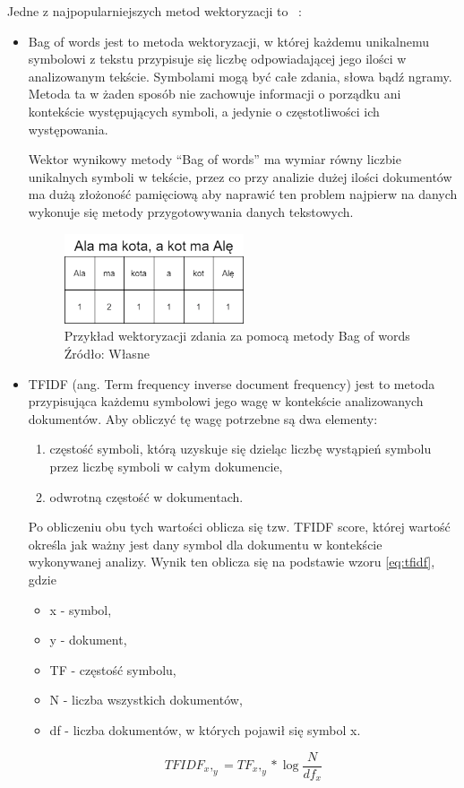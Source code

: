 Jedne z najpopularniejszych metod wektoryzacji to ~\cite{ML}: 
\begin{itemize}
    \item Bag of words jest to metoda wektoryzacji, w której każdemu unikalnemu symbolowi z tekstu przypisuje się liczbę 
    odpowiadającej jego ilości w analizowanym tekście. Symbolami mogą być całe zdania, słowa bądź ngramy. 
    Metoda ta w żaden sposób nie zachowuje informacji o porządku ani kontekście występujących symboli, a jedynie o 
    częstotliwości ich występowania. 
    
    Wektor wynikowy metody ``Bag of words'' ma wymiar równy liczbie unikalnych symboli w tekście, przez co przy analizie dużej ilości 
    dokumentów ma dużą złożoność pamięciową aby naprawić ten problem najpierw na danych wykonuje się metody przygotowywania danych tekstowych.

    \begin{figure}[h]
        \centering
        \includegraphics[width=0.5\textwidth]{./Img/bowexample.png}
        \caption{Przykład wektoryzacji zdania za pomocą metody Bag of words Źródło: Własne}
    \end{figure}

    \item TFIDF (ang. Term frequency inverse document frequency) jest to metoda przypisująca każdemu symbolowi 
    jego wagę w kontekście analizowanych dokumentów. Aby obliczyć tę wagę potrzebne są dwa elementy:
    \begin{enumerate}
        \item częstość symboli, którą uzyskuje się dzieląc liczbę wystąpień symbolu przez liczbę symboli w całym dokumencie,
        \item odwrotną częstość w dokumentach.
    \end{enumerate}
    Po obliczeniu obu tych wartości oblicza się tzw. TFIDF score, której wartość określa jak ważny jest dany symbol 
    dla dokumentu w kontekście wykonywanej analizy. Wynik ten oblicza się na podstawie wzoru \ref{eq:tfidf}, gdzie
    \begin{itemize}
        \item x - symbol,
        \item y - dokument,
        \item TF - częstość symbolu,
        \item N - liczba wszystkich dokumentów,
        \item df - liczba dokumentów, w których pojawił się symbol x.
    \end{itemize}

    \begin{equation}
        \label{eq:tfidf}
        TFIDF_x,_y = TF_x,_y* \log{\frac{N}{df_x}}
    \end{equation}
\end{itemize}